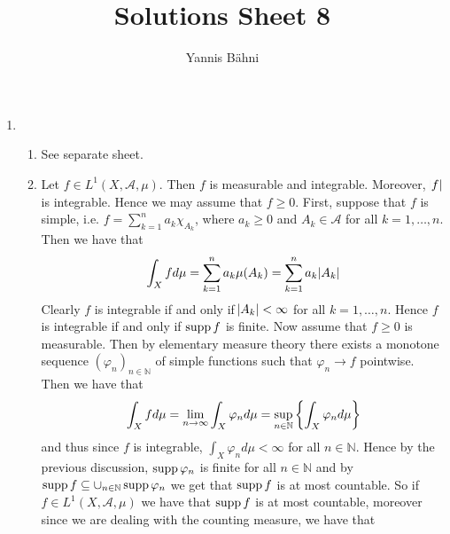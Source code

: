 

\title{Solutions Sheet 8}
\author{Yannis B\"{a}hni}
\address[Yannis B\"{a}hni]{University of Zurich, R\"{a}mistrasse 71, 8006 Zurich}



\maketitle
\thispagestyle{fancy}

\setcounter{section}{1}

\begin{enumerate}[label = \textbf{Exercise \arabic*.},wide = 0pt, itemsep = 1.5ex]
	\item
		~
		\begin{enumerate}[label = \textbf{\alph*.},wide = 0pt, itemsep = 1.5ex]
			\item See separate sheet.
			\item Let $f \in L^1(X,\mathcal{A},\mu)$. Then $f$ is measurable and integrable. Moreover, $\abs{f}$ is integrable. Hence we may assume that $f \geq 0$. First, suppose that $f$ is simple, i.e. $f = \sum_{k = 1}^n a_k \chi_{A_k}$, where $a_k \geq 0$ and $A_k \in \mathcal{A}$ for all $k = 1,\dots,n$. Then we have that
				\begin{equation*}
					\int_X fd\mu = \sum_{k = 1}^n a_k\mu(A_k) = \sum_{k = 1}^n a_k \abs{A_k}
				\end{equation*}
				Clearly $f$ is integrable if and only if $\abs{A_k} < \infty$ for all $k = 1,\dots,n$. Hence $f$ is integrable if and only if $\operatorname{supp} f$ is finite. Now assume that $f \geq 0$ is measurable. Then by elementary measure theory there exists a monotone sequence $(\varphi_n)_{n \in \mathbb{N}}$ of simple functions such that $\varphi_n \to f$ pointwise. Then we have that
				\begin{equation*}
					\int_X f d\mu = \lim_{n \to \infty} \int_X \varphi_n d \mu = \sup_{n \in \mathbb{N}} \cbr{\int_X \varphi_n d\mu}
				\end{equation*}
				\noindent and thus since $f$ is integrable, $\int_X \varphi_n d\mu < \infty$ for all $n \in \mathbb{N}$. Hence by the previous discussion, $\operatorname{supp} \varphi_n$ is finite for all $n \in \mathbb{N}$ and by $\operatorname{supp} f \subseteq \cup_{n \in \mathbb{N}}\operatorname{supp} \varphi_n$ we get that $\operatorname{supp} f$ is at most countable. So if $f \in L^1(X,\mathcal{A},\mu)$ we have that $\operatorname{supp} f$ is at most countable, moreover since we are dealing with the counting measure, we have that

\end{enumerate}
\end{enumerate}
